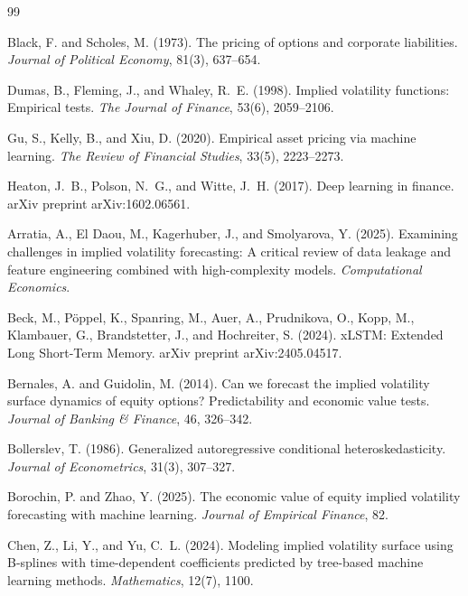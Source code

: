 \documentclass[12pt]{report}
\begin{document}
\cleardoublepage
{}
\begin{thebibliography}{99}

Black, F. and Scholes, M. (1973).
\newblock The pricing of options and corporate liabilities.
\newblock \emph{Journal of Political Economy}, 81(3), 637--654.

Dumas, B., Fleming, J., and Whaley, R.~E. (1998).
\newblock Implied volatility functions: Empirical tests.
\newblock \emph{The Journal of Finance}, 53(6), 2059--2106.

Gu, S., Kelly, B., and Xiu, D. (2020).
\newblock Empirical asset pricing via machine learning.
\newblock \emph{The Review of Financial Studies}, 33(5), 2223--2273.

Heaton, J.~B., Polson, N.~G., and Witte, J.~H. (2017).
\newblock Deep learning in finance.
\newblock arXiv preprint arXiv:1602.06561.

Arratia, A., El Daou, M., Kagerhuber, J., and Smolyarova, Y. (2025).
\newblock Examining challenges in implied volatility forecasting: A critical review of data leakage and feature engineering combined with high-complexity models.
\newblock \emph{Computational Economics}.

Beck, M., P\"oppel, K., Spanring, M., Auer, A., Prudnikova, O., Kopp, M., Klambauer, G., Brandstetter, J., and Hochreiter, S. (2024).
\newblock xLSTM: Extended Long Short-Term Memory.
\newblock arXiv preprint arXiv:2405.04517.

Bernales, A. and Guidolin, M. (2014).
\newblock Can we forecast the implied volatility surface dynamics of equity options? Predictability and economic value tests.
\newblock \emph{Journal of Banking \& Finance}, 46, 326--342.

Bollerslev, T. (1986).
\newblock Generalized autoregressive conditional heteroskedasticity.
\newblock \emph{Journal of Econometrics}, 31(3), 307--327.

Borochin, P. and Zhao, Y. (2025).
\newblock The economic value of equity implied volatility forecasting with machine learning.
\newblock \emph{Journal of Empirical Finance}, 82.

Chen, Z., Li, Y., and Yu, C.~L. (2024).
\newblock Modeling implied volatility surface using B-splines with time-dependent coefficients predicted by tree-based machine learning methods.
\newblock \emph{Mathematics}, 12(7), 1100.


\end{thebibliography}
\end{document}

